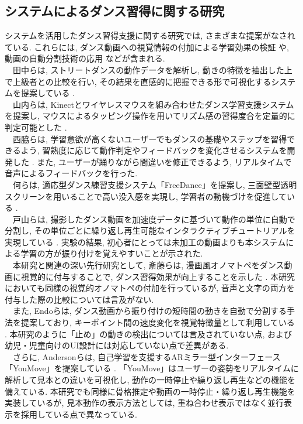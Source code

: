 \documentclass[paper]{ieicej}
\begin{document}
\subsection{システムによるダンス習得に関する研究}
システムを活用したダンス習得支援に関する研究では, さまざまな提案がなされている. これらには, ダンス動画への視覚情報の付加による学習効果の検証 \cite{ref15}や, 動画の自動分割技術の応用 \cite{ref16}などが含まれる. \\
　田中らは, ストリートダンスの動作データを解析し, 動きの特徴を抽出した上で上級者との比較を行い, その結果を直感的に把握できる形で可視化するシステムを提案している \cite{ref17}. \\
　山内らは, Kinectとワイヤレスマウスを組み合わせたダンス学習支援システムを提案し, マウスによるタッピング操作を用いてリズム感の習得度合を定量的に判定可能とした \cite{ref18}.\\
　西脇らは, 学習意欲が高くないユーザーでもダンスの基礎やステップを習得できるよう, 習熟度に応じて動作判定やフィードバックを変化させるシステムを開発した \cite{ref19}. また, ユーザーが踊りながら間違いを修正できるよう, リアルタイムで音声によるフィードバックを行った. \\
　何らは, 適応型ダンス練習支援システム「FreeDance」を提案し, 三面壁型透明スクリーンを用いることで高い没入感を実現し, 学習者の動機づけを促進している \cite{ref20}. \\
　戸山らは, 撮影したダンス動画を加速度データに基づいて動作の単位に自動で分割し, その単位ごとに繰り返し再生可能なインタラクティブチュートリアルを実現している \cite{ref21}. 実験の結果, 初心者にとっては未加工の動画よりも本システムによる学習の方が振り付けを覚えやすいことが示された. \\
　本研究と関連の深い先行研究として, 斎藤らは, 漫画風オノマトペをダンス動画に視覚的に付与することで, ダンス習得効果が向上することを示した \cite{ref15}. 本研究においても同様の視覚的オノマトペの付加を行っているが, 音声と文字の両方を付与した際の比較については言及がない. \\
　また, Endoらは, ダンス動画から振り付けの短時間の動きを自動で分割する手法を提案しており, キーポイント間の速度変化を視覚特徴量として利用している \cite{ref16}. 本研究のように「止め」の動きの検出については言及されていない点, および幼児・児童向けのUI設計には対応していない点で差異がある. \\
　さらに, Andersonらは, 自己学習を支援するARミラー型インターフェース「YouMove」を提案している \cite{ref22}. 「YouMove」はユーザーの姿勢をリアルタイムに解析して見本との違いを可視化し, 動作の一時停止や繰り返し再生などの機能を備えている. 本研究でも同様に骨格推定や動画の一時停止・繰り返し再生機能を実装しているが, 見本動作の表示方法としては, 重ね合わせ表示ではなく並行表示を採用している点で異なっている.\\
\end{document}
